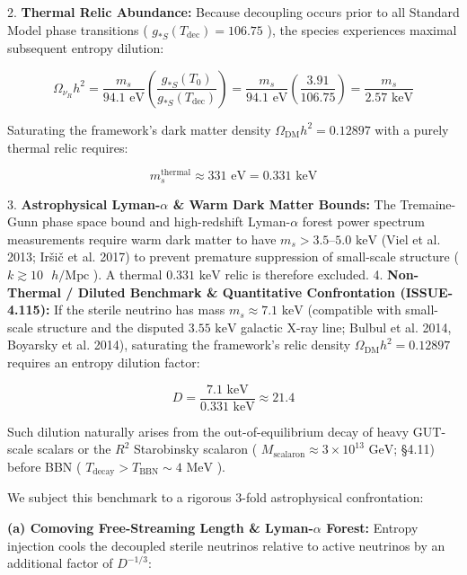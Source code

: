\documentclass[11pt,a4paper]{article}
\theoremstyle{definition}\newtheorem{definition}{Definition}
\theoremstyle{remark}\newtheorem{remark}{Remark}
\begin{document}
2. \textbf{Thermal Relic Abundance:} Because decoupling occurs prior to all Standard Model phase transitions ( $g_{*S}(T_{\text{dec}}) = 106.75$ ), the species experiences maximal subsequent entropy dilution:


\begin{equation}
\Omega_{\nu_R} h^2 = \frac{m_s}{94.1\text{ eV}} \left(\frac{g_{*S}(T_0)}{g_{*S}(T_{\text{dec}})}\right) = \frac{m_s}{94.1\text{ eV}} \left(\frac{3.91}{106.75}\right) = \frac{m_s}{2.57\text{ keV}}
\end{equation}


Saturating the framework's dark matter density $\Omega_{\text{DM}} h^2 = 0.12897$ with a purely thermal relic requires:


\begin{equation}
m_s^{\text{thermal}} \approx 331\text{ eV} = 0.331\text{ keV}
\end{equation}


3. \textbf{Astrophysical Lyman-$\alpha$ \& Warm Dark Matter Bounds:} The Tremaine-Gunn phase space bound and high-redshift Lyman-$\alpha$ forest power spectrum measurements require warm dark matter to have $m_s > 3.5\text{--}5.0\text{ keV}$ (Viel et al. 2013; Ir\v{s}i\v{c} et al. 2017) to prevent premature suppression of small-scale structure ( $k \gtrsim 10\text{ }h\text{/Mpc}$ ). A thermal $0.331\text{ keV}$ relic is therefore excluded.
4. \textbf{Non-Thermal / Diluted Benchmark \& Quantitative Confrontation (ISSUE-4.115):}
If the sterile neutrino has mass $m_s \approx 7.1\text{ keV}$ (compatible with small-scale structure and the disputed $3.55\text{ keV}$ galactic X-ray line; Bulbul et al. 2014, Boyarsky et al. 2014), saturating the framework's relic density $\Omega_{\text{DM}} h^2 = 0.12897$ requires an entropy dilution factor:


\begin{equation}
D = \frac{7.1\text{ keV}}{0.331\text{ keV}} \approx 21.4
\end{equation}


Such dilution naturally arises from the out-of-equilibrium decay of heavy GUT-scale scalars or the $R^2$ Starobinsky scalaron ( $M_{\text{scalaron}} \approx 3 \times 10^{13}\text{ GeV}$; §4.11) before BBN ( $T_{\text{decay}} > T_{\text{BBN}} \sim 4\text{ MeV}$ ).

We subject this benchmark to a rigorous 3-fold astrophysical confrontation:

\textbf{(a) Comoving Free-Streaming Length \& Lyman-$\alpha$ Forest:}
Entropy injection cools the decoupled sterile neutrinos relative to active neutrinos by an additional factor of $D^{-1/3}$:
\end{document}

